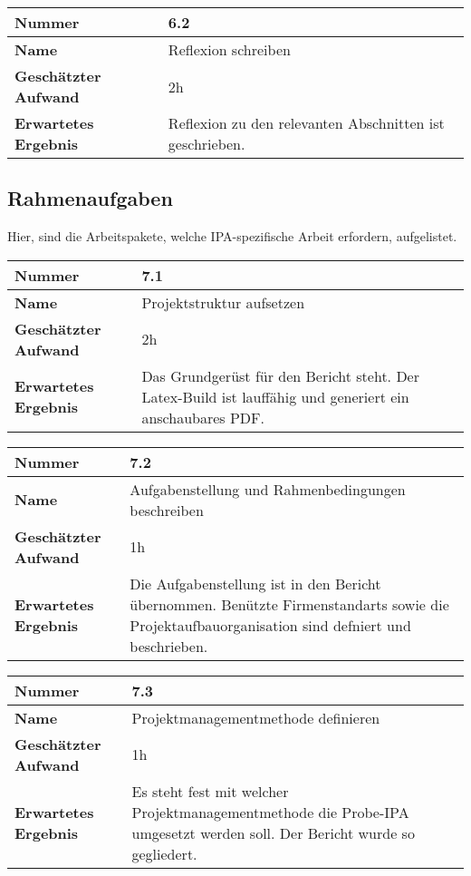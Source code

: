 \begin{longtable}{p{}|p{}}
	\hline
	\textbf{Nummer}    				& 6.2 \\
	\hline
	\textbf{Name}   				& Reflexion schreiben \\
	\hline
	\textbf{Geschätzter Aufwand}	& 2h \\
	\hline
	\textbf{Erwartetes Ergebnis}	& Reflexion zu den relevanten Abschnitten ist geschrieben. \\
	\hline
\end{longtable}

\subsection{Rahmenaufgaben}
Hier, sind die Arbeitspakete, welche IPA-spezifische Arbeit erfordern, aufgelistet.

\begin{longtable}{p{}|p{}}
	\hline
	\textbf{Nummer}    				& 7.1 \\
	\hline
	\textbf{Name}   				& Projektstruktur aufsetzen\\
	\hline
	\textbf{Geschätzter Aufwand}	& 2h \\
	\hline
	\textbf{Erwartetes Ergebnis}	& Das Grundgerüst für den Bericht steht. Der Latex-Build ist lauffähig und generiert ein anschaubares PDF.\\
	\hline
\end{longtable}

\begin{longtable}{p{}|p{}}
	\hline
	\textbf{Nummer}    				& 7.2 \\
	\hline
	\textbf{Name}   				& Aufgabenstellung und Rahmenbedingungen beschreiben\\
	\hline
	\textbf{Geschätzter Aufwand}	& 1h \\
	\hline
	\textbf{Erwartetes Ergebnis}	& Die Aufgabenstellung ist in den Bericht übernommen. Benützte Firmenstandarts sowie die Projektaufbauorganisation sind defniert und beschrieben. \\
	\hline
\end{longtable}

\begin{longtable}{p{}|p{}}
	\hline
	\textbf{Nummer}    				& 7.3 \\
	\hline
	\textbf{Name}   				& Projektmanagementmethode definieren\\
	\hline
	\textbf{Geschätzter Aufwand}	& 1h \\
	\hline
	\textbf{Erwartetes Ergebnis}	& Es steht fest mit welcher Projektmanagementmethode die Probe-IPA umgesetzt werden soll. Der Bericht wurde so gegliedert.\\
	\hline
\end{longtable}

